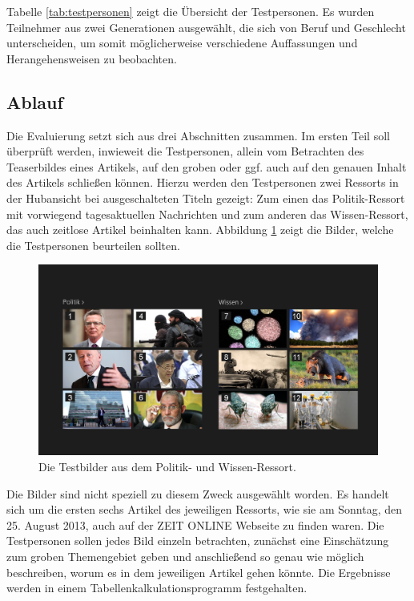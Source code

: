 \documentclass[12pt,a4paper,bibtotoc,abstracton]{scrartcl}
\begin{document}
Tabelle \ref{tab:testpersonen} zeigt die Übersicht der Testpersonen. Es wurden Teilnehmer aus zwei Generationen ausgewählt, die sich von Beruf und Geschlecht unterscheiden, um somit möglicherweise verschiedene Auffassungen und Herangehensweisen zu beobachten.


\subsection{Ablauf}
\label{subsec:ablauf}
Die Evaluierung setzt sich aus drei Abschnitten zusammen. Im ersten Teil soll überprüft werden, inwieweit die Testpersonen, allein vom Betrachten des Teaserbildes eines Artikels, auf den groben oder ggf. auch auf den genauen Inhalt des Artikels schließen können. Hierzu werden den Testpersonen zwei Ressorts in der Hubansicht bei ausgeschalteten Titeln gezeigt: Zum einen das Politik-Ressort mit vorwiegend tagesaktuellen Nachrichten und zum anderen das Wissen-Ressort, das auch zeitlose Artikel beinhalten kann. Abbildung \ref{fig:testbilder} zeigt die Bilder, welche die Testpersonen beurteilen sollten.

\begin{figure}[h]
	\centering
	\includegraphics[width=\textwidth]{Evaluierung/Testbilder/collage_politik_wissen_numbers.png} 
	\caption{Die Testbilder aus dem Politik- und Wissen-Ressort.}
	\label{fig:testbilder}
\end{figure}  

Die Bilder sind nicht speziell zu diesem Zweck ausgewählt worden. Es handelt sich um die ersten sechs Artikel des jeweiligen Ressorts, wie sie am Sonntag, den 25. August 2013, auch auf der ZEIT ONLINE Webseite zu finden waren. Die Testpersonen sollen jedes Bild einzeln betrachten, zunächst eine Einschätzung zum groben Themengebiet geben und anschließend so genau wie möglich beschreiben, worum es in dem jeweiligen Artikel gehen könnte. Die Ergebnisse werden in einem Tabellenkalkulationsprogramm festgehalten.
\end{document}
